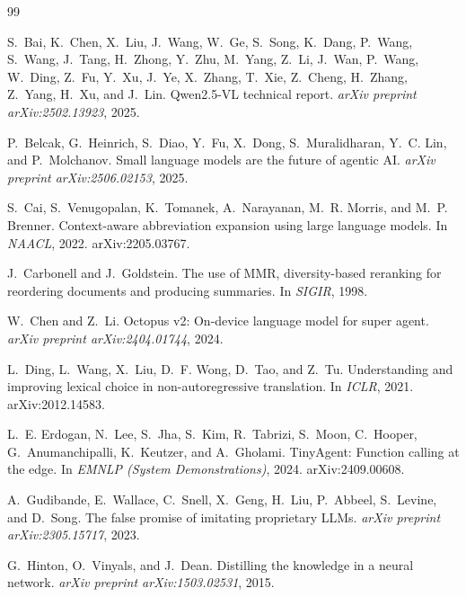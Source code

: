 \begin{thebibliography}{99}

S.~Bai, K.~Chen, X.~Liu, J.~Wang, W.~Ge, S.~Song, K.~Dang, P.~Wang, S.~Wang,
J.~Tang, H.~Zhong, Y.~Zhu, M.~Yang, Z.~Li, J.~Wan, P.~Wang, W.~Ding, Z.~Fu,
Y.~Xu, J.~Ye, X.~Zhang, T.~Xie, Z.~Cheng, H.~Zhang, Z.~Yang, H.~Xu, and
J.~Lin.
\newblock Qwen2.5-VL technical report.
\newblock \emph{arXiv preprint arXiv:2502.13923}, 2025.

P.~Belcak, G.~Heinrich, S.~Diao, Y.~Fu, X.~Dong, S.~Muralidharan,
Y.~C. Lin, and P.~Molchanov.
\newblock Small language models are the future of agentic AI.
\newblock \emph{arXiv preprint arXiv:2506.02153}, 2025.

S.~Cai, S.~Venugopalan, K.~Tomanek, A.~Narayanan, M.~R. Morris,
and M.~P. Brenner.
\newblock Context-aware abbreviation expansion using large language models.
\newblock In \emph{NAACL}, 2022. arXiv:2205.03767.

J.~Carbonell and J.~Goldstein.
\newblock The use of MMR, diversity-based reranking for reordering documents
and producing summaries.
\newblock In \emph{SIGIR}, 1998.

W.~Chen and Z.~Li.
\newblock Octopus v2: On-device language model for super agent.
\newblock \emph{arXiv preprint arXiv:2404.01744}, 2024.

L.~Ding, L.~Wang, X.~Liu, D.~F. Wong, D.~Tao, and Z.~Tu.
\newblock Understanding and improving lexical choice in
non-autoregressive translation.
\newblock In \emph{ICLR}, 2021. arXiv:2012.14583.

L.~E. Erdogan, N.~Lee, S.~Jha, S.~Kim, R.~Tabrizi, S.~Moon, C.~Hooper,
G.~Anumanchipalli, K.~Keutzer, and A.~Gholami.
\newblock TinyAgent: Function calling at the edge.
\newblock In \emph{EMNLP (System Demonstrations)}, 2024.
arXiv:2409.00608.

A.~Gudibande, E.~Wallace, C.~Snell, X.~Geng, H.~Liu, P.~Abbeel,
S.~Levine, and D.~Song.
\newblock The false promise of imitating proprietary LLMs.
\newblock \emph{arXiv preprint arXiv:2305.15717}, 2023.

G.~Hinton, O.~Vinyals, and J.~Dean.
\newblock Distilling the knowledge in a neural network.
\newblock \emph{arXiv preprint arXiv:1503.02531}, 2015.


\end{thebibliography}
